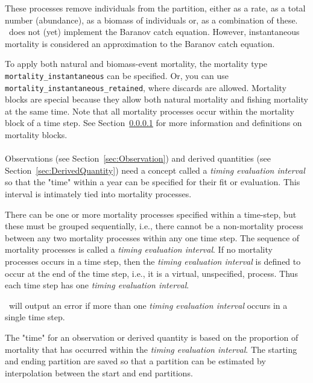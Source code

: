 These processes remove individuals from the partition, either as a rate, as a total number (abundance), as a biomass of individuals or, as a combination of these. \CNAME\ does not (yet) implement the Baranov catch equation. However, instantaneous mortality is considered an approximation to the Baranov catch equation.

To apply both natural and biomass-event mortality, the mortality type \texttt{mortality\_instantaneous} can be specified. Or, you can use \texttt{mortality\_instantaneous\_retained}, where discards are allowed. Mortality blocks are special because they allow both natural mortality and fishing mortality at the same time. Note that all mortality processes occur within the mortality block of a time step. See Section~\ref{sec:MortalityBlock} for more information and definitions on mortality blocks.


\paragraph{}\label{sec:MortalityBlock}\label{sec:TimingEvaluationInterval}


Observations (see Section~\ref{sec:Observation})  and derived quantities (see Section~\ref{sec:DerivedQuantity}) need a concept called a \emph{timing evaluation interval} so that the "time" within a year can be specified for their fit or evaluation. This interval is intimately tied into mortality processes.

There can be one or more mortality processes specified within a time-step, but these must  be grouped sequentially, i.e., there cannot be a non-mortality process between any two mortality processes within any one time step. The sequence of mortality processes is called a \emph{timing evaluation interval}.  If no mortality processes occurs in a time step, then the \emph{timing evaluation interval} is defined to occur at the end of the time step, i.e., it is a virtual, unspecified,  process. Thus  each time step has one \emph{timing evaluation interval}.

\CNAME\ will output an error if more than one \textit{timing evaluation interval} occurs in a single time step.

The "time" for an observation or derived quantity is based on the proportion of mortality that has occurred within the \textit{timing evaluation interval}. The starting and ending partition are saved so that a partition can be estimated by  interpolation between the start and end partitions.

